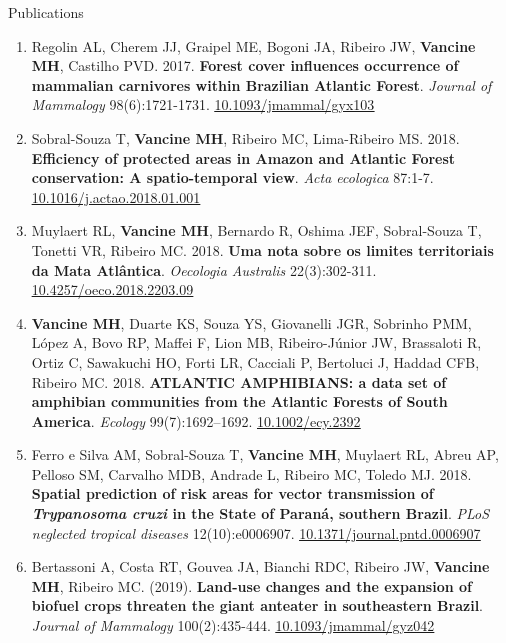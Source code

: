 \documentclass{resume}
\begin{document}
\begin{rSection}{Publications}
\begin{enumerate}
\item Regolin AL, Cherem JJ, Graipel ME, Bogoni JA, Ribeiro JW, {\bf Vancine MH}, Castilho PVD. 2017. {\bf Forest cover influences occurrence of mammalian carnivores within Brazilian Atlantic Forest}. {\it Journal of Mammalogy} 98(6):1721-1731. \href{https://doi.org/10.1093/jmammal/gyx103}{\underline{10.1093/jmammal/gyx103}}

\item Sobral-Souza T, {\bf Vancine MH}, Ribeiro MC, Lima-Ribeiro MS. 2018. {\bf Efficiency of protected areas in Amazon and Atlantic Forest conservation: A spatio-temporal view}. {\it Acta ecologica} 87:1-7. \href{https://doi.org/10.1016/j.actao.2018.01.001}{\underline{10.1016/j.actao.2018.01.001}}

\item Muylaert RL, {\bf Vancine MH}, Bernardo R, Oshima JEF, Sobral-Souza T, Tonetti VR, Ribeiro MC. 2018. {\bf Uma nota sobre os limites territoriais da Mata Atlântica}. {\it Oecologia Australis} 22(3):302-311. \href{https://doi.org/10.4257/oeco.2018.2203.09}{\underline{10.4257/oeco.2018.2203.09}}

\item {\bf Vancine MH}, Duarte KS, Souza YS, Giovanelli JGR, Sobrinho PMM, López A, Bovo RP, Maffei F, Lion MB, Ribeiro-Júnior JW, Brassaloti R, Ortiz C, Sawakuchi HO, Forti LR, Cacciali P, Bertoluci J, Haddad CFB, Ribeiro MC. 2018. {\bf ATLANTIC AMPHIBIANS: a data set of amphibian communities from the Atlantic Forests of South America}. {\it Ecology} 99(7):1692–1692. \href{https://doi.org/10.1002/ecy.2392}{\underline{10.1002/ecy.2392}}

\item Ferro e Silva AM, Sobral-Souza T, {\bf Vancine MH}, Muylaert RL, Abreu AP, Pelloso SM, Carvalho MDB, Andrade L, Ribeiro MC, Toledo MJ. 2018. {\bf Spatial prediction of risk areas for vector transmission of {\it Trypanosoma cruzi} in the State of Paraná, southern Brazil}. {\it PLoS neglected tropical diseases} 12(10):e0006907. \href{https://doi.org/10.1371/journal.pntd.0006907}{\underline{10.1371/journal.pntd.0006907}}

\item Bertassoni A, Costa RT, Gouvea JA, Bianchi RDC, Ribeiro JW, {\bf Vancine MH}, Ribeiro MC. (2019). {\bf Land-use changes and the expansion of biofuel crops threaten the giant anteater in southeastern Brazil}. {\it Journal of Mammalogy} 100(2):435-444. \href{https://doi.org/10.1093/jmammal/gyz042}{\underline{10.1093/jmammal/gyz042}}


\end{enumerate}
\end{rSection}
\end{document}
